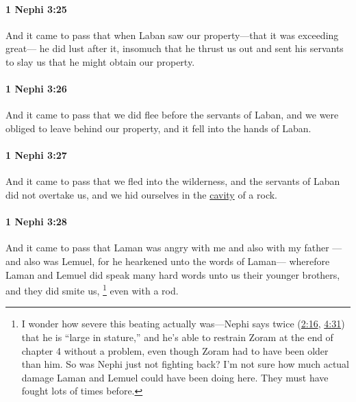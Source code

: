 		\paragraph{1 Nephi 3:25} %
			\label{1NEPHI-3-25}

			And it came to pass that
			when Laban saw our property---that it was exceeding great---
			he did lust after it,
			insomuch that he thrust us out and sent his servants to slay us
			that he might obtain our property.

		\paragraph{1 Nephi 3:26} %
			\label{1NEPHI-3-26}

			And it came to pass that we did flee before the servants of Laban,
			and we were obliged to leave behind our property,
			and it fell into the hands of Laban.

		\paragraph{1 Nephi 3:27} %
			\label{1NEPHI-3-27}

			And it came to pass that we fled into the wilderness,
			and the servants of Laban did not overtake us,
			and we hid ourselves in the \hyperref[CAVITY]{cavity} of a rock.

		\paragraph{1 Nephi 3:28} %
			\label{1NEPHI-3-28}

			And it came to pass that Laman was angry with me and also with my father
			---and also was Lemuel, for he hearkened unto the words of Laman---
			wherefore Laman and Lemuel did speak many hard words
			unto us their younger brothers,
			and they did smite us,%
				\footnote{%
					I wonder how severe this beating actually was---Nephi says twice (\hyperref[1NEPHI-2-16]{2:16}, \hyperref[1NEPHI-4-31]{4:31}) that he is ``large in stature,'' and he's able to restrain Zoram at the end of chapter 4 without a problem, even though Zoram had to have been older than him. So was Nephi just not fighting back? I'm not sure how much actual damage Laman and Lemuel could have been doing here. They must have fought lots of times before.
					}
			even with a rod.

